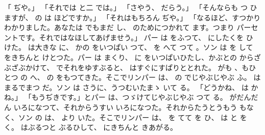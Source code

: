 \documentclass[a4paper,
tate,
book]
{jlreq}
\begin{document}
「 ぢや。」
「それでは と二 では。」
「さやう、 だらう。」
「そんならも つ ひますが、 の は ほどですか。」
「それはもちろん ぢや。」
「なるほど、すつかりわかりました。あなたは でもまだ し、 のためにつかれて ます。つまり パーセントです。それではなほしてあげませう。」
  パー は をふつて、 にしたくを ひ けた。 は大きな に、 かの をいつぱい つて、 を へて つて 。ソン は を して をきちんと けとつた。パー は まくり、 に をいつぱいひたし、かぶとの からざぶざぶかけて、 でそれをゆすぶると、 はすぐにすぱりととれた。 がも 、もひとつ の  へ、 の をもつてきた。そこでリンパー は、 の でじやぶじやぶ ふ。 はまるでまつ だ。ソン は さうに、うつむいたまゝ いて る。
「どうかね、 は かね。」
「もうぢきです。」とパー は、つゞけてじやぶじやぶ つて る。 がだんだん いろになつて、それからうすい いろになつた。それからたうとうもう もなく、ソン の は、 より  いた。そこでリンパー は、 を てて を ひ、 は と を く。 はぶるつと ぶるひして、 にきちんと きあがる。
\end{document}
